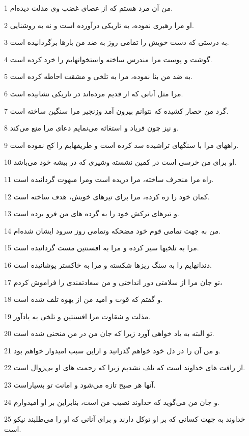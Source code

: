 \par 1 من آن مرد هستم که از عصای غضب وی مذلت دیده‌ام.
\par 2 او مرا رهبری نموده، به تاریکی در‌آورده است و نه به روشنایی.
\par 3 به درستی که دست خویش را تمامی روز به ضد من بارها برگردانیده است.
\par 4 گوشت و پوست مرا مندرس ساخته واستخوانهایم را خرد کرده است.
\par 5 به ضد من بنا نموده، مرا به تلخی و مشقت احاطه کرده است.
\par 6 مرا مثل آنانی که از قدیم مرده‌اند در تاریکی نشانیده است.
\par 7 گرد من حصار کشیده که نتوانم بیرون آمد وزنجیر مرا سنگین ساخته است.
\par 8 و نیز چون فریاد و استغاثه می‌نمایم دعای مرا منع می‌کند.
\par 9 راههای مرا با سنگهای تراشیده سد کرده است و طریقهایم را کج نموده است.
\par 10 او برای من خرسی است در کمین نشسته وشیری که در بیشه خود می‌باشد.
\par 11 راه مرا منحرف ساخته، مرا دریده است ومرا مبهوت گردانیده است.
\par 12 کمان خود را زه کرده، مرا برای تیرهای خویش، هدف ساخته است.
\par 13 و تیرهای ترکش خود را به گرده های من فرو برده است.
\par 14 من به جهت تمامی قوم خود مضحکه وتمامی روز سرود ایشان شده‌ام.
\par 15 مرا به تلخیها سیر کرده و مرا به افسنتین مست گردانیده است.
\par 16 دندانهایم را به سنگ ریزها شکسته و مرا به خاکستر پوشانیده است.
\par 17 تو جان مرا از سلامتی دور انداختی و من سعادتمندی را فراموش کردم،
\par 18 و گفتم که قوت و امید من از یهوه تلف شده است.
\par 19 مذلت و شقاوت مرا افسنتین و تلخی به یادآور.
\par 20 تو البته به یاد خواهی آورد زیرا که جان من در من منحنی شده است.
\par 21 و من آن را در دل خود خواهم گذرانید و ازاین سبب امیدوار خواهم بود.
\par 22 از رافت های خداوند است که تلف نشدیم زیرا که رحمت های او بی‌زوال است.
\par 23 آنها هر صبح تازه می‌شود و امانت تو بسیاراست.
\par 24 و جان من می‌گوید که خداوند نصیب من است، بنابراین بر او امیدوارم.
\par 25 خداوند به جهت کسانی که بر او توکل دارند و برای آنانی که او را می‌طلبند نیکو است.
